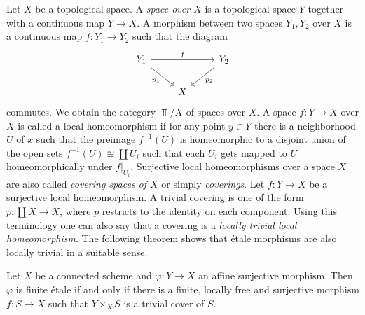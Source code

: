 \begin{remark}
	Let $X$ be a topological space. A \textit{space over $X$ } is a topological space $Y$ together with a continuous map $Y \to X$. A morphism between two spaces $Y_1, Y_2$ over $X$ is a continuous map $f: Y_1 \to Y_2$ such that the diagram
	\[
		\begin{tikzcd}
			{Y_1} && {Y_2} \\
			& X
			\arrow["f", from=1-1, to=1-3]
			\arrow["{p_2}", from=1-3, to=2-2]
			\arrow["{p_1}"', from=1-1, to=2-2]
		\end{tikzcd}
	\]
	commutes. We obtain the category $\Top/X$ of spaces over $X$. A space $f: Y \to X$ over $X$ is called a local homeomorphism if for any point $y \in Y$ there is a neighborhood $U$ of $x$ such that the preimage $f^{-1}(U)$ is homeomorphic to a disjoint union of the open sets $f^{-1}(U) \cong \coprod U_i$ such that each $U_i$ gets mapped to $U$ homeomorphically under $f|_{U_i}$. Surjective local homeomorphisms over a space $X$ are also called \textit{covering spaces of $X$} or simply \textit{coverings}. Let $f: Y \to X$ be a surjective local homeomorphism. A trivial covering is one of the form $p: \coprod X \to X$, where $p$ restricts to the identity on each component. Using this terminology one can also say that a covering is a \textit{locally trivial local homeomorphism}. The following theorem shows that \'etale morphisms are also locally trivial in a suitable sense.
\end{remark}

\begin{theorem}
	\label{locallyTrivial}
	Let $X$ be a connected scheme and $\varphi : Y \to X$ an affine surjective morphism. Then $\varphi$ is finite \'etale if and only if there is a finite, locally free and surjective morphism $f: S \to X$ such that $Y \times_X S$ is a trivial cover of $S$.
\end{theorem}

